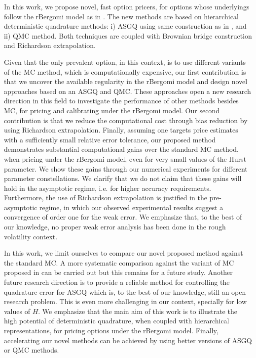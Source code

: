 In this work,  we propose  novel, fast option pricers,  for options whose underlyings  follow the rBergomi model as in \cite{bayer2016pricing}.  The new methods  are based on hierarchical deterministic quadrature methods:  i) ASGQ using same construction as in \cite{haji2016multi}, and ii) QMC method. Both techniques are coupled with Brownian bridge construction and Richardson extrapolation.

Given that the only prevalent option, in this context, is to use different variants of the MC method, which is computationally expensive, our first contribution  is that we uncover the available regularity in the rBergomi model and  design novel  approaches based on an ASGQ and QMC. These approaches  open a new research direction in this field to investigate the performance of other methods besides MC, for pricing and calibrating under the rBergomi model. Our second contribution is that we reduce the computational cost  through bias reduction by using Richardson extrapolation. Finally, assuming one targets price estimates with a sufficiently small relative error tolerance, our proposed method demonstrates substantial computational gains  over the standard MC method, when pricing under the rBergomi model, even for very small values of the Hurst parameter. We show  these gains through our numerical experiments for  different parameter constellations.  We clarify that we do not claim that these gains will hold in the asymptotic regime, i.e.  for higher accuracy requirements. Furthermore, the use of Richardson extrapolation is justified in the pre-asymptotic regime, in which our observed experimental results suggest a convergence of order one for the weak error. We emphasize that, to the best of our knowledge, no proper weak error analysis has been done in the rough volatility context. 

In this work, we limit ourselves to compare our novel proposed method against the standard MC. A more systematic comparison against the variant of MC proposed in \cite{mccrickerd2018turbocharging}  can be carried out but this remains for a future study. Another future research direction is to provide a reliable method for controlling the quadrature error for ASGQ which is,  to the best of our knowledge,  still  an open research problem. This is even more challenging in our context, specially for low values of $H$. We emphasize that the main aim of this work is to illustrate the high potential of deterministic quadrature, when coupled with hierarchical representations, for pricing options under the rBergomi model.   Finally, accelerating  our novel  methods can be achieved  by using better versions of ASGQ or QMC methods.
